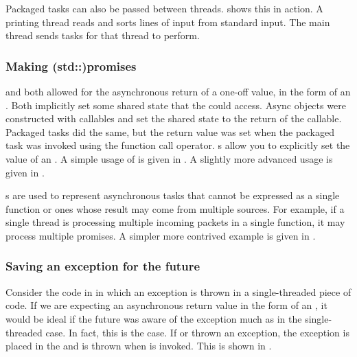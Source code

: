 Packaged tasks can also be passed between threads.  shows this in action. A printing thread reads and sorts lines of input from standard input. The main thread sends tasks for that thread to perform.


\subsubsection{Making (std::)promises}
 and  both allowed for the asynchronous return of a one-off value, in the form of an . Both implicitly set some shared state that the  could access. Async objects were constructed with callables and set the shared state to the return of the callable. Packaged tasks did the same, but the return value was set when the packaged task was invoked using the function call operator. s allow you to explicitly set the value of an . A simple usage of  is given in . A slightly more advanced usage is given in .


s are used to represent asynchronous tasks that cannot be expressed as a single function or ones whose result may come from multiple sources. For example, if a single thread is processing multiple incoming packets in a single function, it may process multiple promises. A simpler more contrived example is given in .


\subsubsection{Saving an exception for the future}
Consider the code in  in which an exception is thrown in a single-threaded piece of code. If we are expecting an asynchronous return value in the form of an , it would be ideal if the future was aware of the exception much as in the single-threaded case. In fact, this is the case. If  or  thrown an exception, the exception is placed in the  and is thrown when  is invoked. This is shown in .

